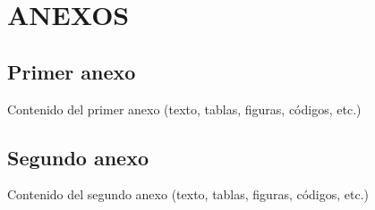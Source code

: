 \documentclass[a4paper, 11pt, spanish, twoside]{article}
\begin{document}
\appto{\bibsetup}{\sloppy}
\printbibliography[heading=bibintoc, title=BIBLIOGRAFÍA] %




\newpage

\section*{ANEXOS} \label{sec:anexos} %

\renewcommand{\thesubsection}{\Alph{subsection}} %
\renewcommand{\thetable}{\Alph{subsection}.\arabic{table}}
\renewcommand{\thefigure}{\Alph{subsection}.\arabic{figure}}
\renewcommand{\thecode}{\Alph{subsection}.\arabic{code}}

\subsection{Primer anexo} \label{sec:anexo1}

Contenido del primer anexo (texto, tablas, figuras, códigos, etc.)

\newpage
\subsection{Segundo anexo} \label{sec:anexo2}

Contenido del segundo anexo (texto, tablas, figuras, códigos, etc.)



\end{document}
